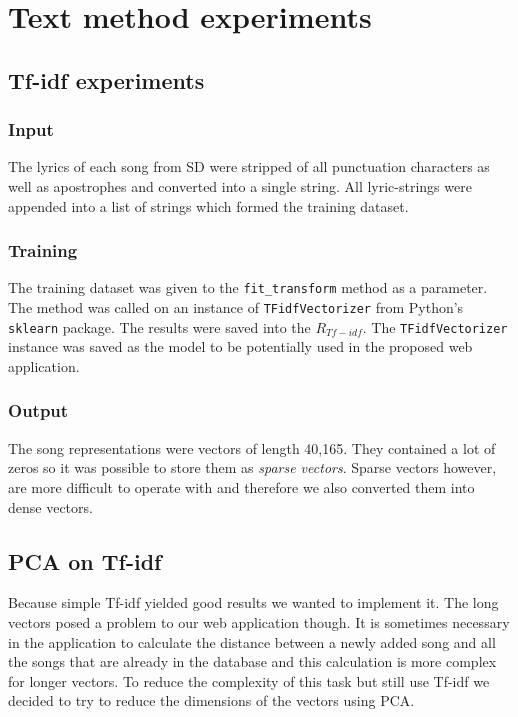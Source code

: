 \section{Text method experiments}\label{sec:text_experiments}

\subsection{Tf-idf experiments}\label{ssec:TF_idf_experiments}

\subsubsection{Input}
The lyrics of each song from SD were stripped of all punctuation characters as well as apostrophes and converted into a single string. All lyric-strings were appended into a list of strings which formed the training dataset.
\subsubsection{Training}
The training dataset was given to the \texttt{fit\_transform} method as a parameter. The method was called on an instance of \texttt{TFidfVectorizer} from Python's \texttt{sklearn} package. The results were saved into the $R_{Tf-idf}$. The \texttt{TFidfVectorizer} instance was saved as the model to be potentially used in the proposed web application. 

\subsubsection{Output}
The song representations were vectors of length 40,165. They contained a lot of zeros so it was possible to store them as \textit{sparse vectors}. Sparse vectors however, are more difficult to operate with and therefore we also converted them into dense vectors.

\subsection{PCA on Tf-idf}\label{ssec:PCA_on_tf_idf_experiments}

Because simple Tf-idf yielded good results we wanted to implement it. The long vectors posed a problem to our web application though. It is sometimes necessary in the application to calculate the distance between a newly added song and all the songs that are already in the database and this calculation is more complex for longer vectors. To reduce the complexity of this task but still use Tf-idf we decided to try to reduce the dimensions of the vectors using PCA.

